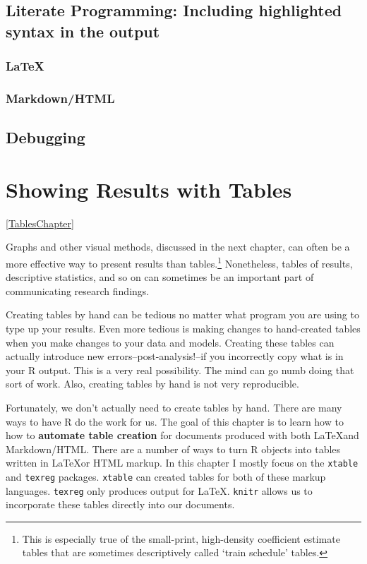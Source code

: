 \documentclass[ChapterTOCs,krantz1]{krantz}\usepackage{graphicx, color}
\begin{document}
{{\section{Literate Programming: Including highlighted syntax in the output}

\subsection{\LaTeX}

\subsection{Markdown/HTML}

\section{Debugging}





\chapter{Showing Results with Tables}\ref{TablesChapter}

Graphs and other visual methods, discussed in the next chapter, can
often be a more effective way to present results than tables.\footnote{This
  is especially true of the small-print, high-density coefficient
  estimate tables that are sometimes descriptively called `train
  schedule' tables.} Nonetheless, tables of results, descriptive statistics,
and so on can sometimes be an important part of communicating
research findings.

Creating tables by hand can be tedious no matter what program you are
using to type up your results. Even more tedious is making changes to
hand-created tables when you make changes to your data and models.
Creating these tables can actually introduce new
errors--post-analysis!--if you incorrectly copy what is in your
R output. This is a very real possibility. The mind can go numb
doing that sort of work. Also, creating tables by hand is not very
reproducible.

Fortunately, we don't actually need to create tables by hand. There are
many ways to have R do the work for us. The goal of this
chapter is to learn how to how to \textbf{automate table creation} for
documents produced with both \LaTeX and Markdown/HTML. There are a
number of ways to turn R objects into tables written in
\LaTeX or HTML markup. In this chapter I mostly focus on the
\texttt{xtable} and \texttt{texreg} packages. \texttt{xtable} can
created tables for both of these markup languages. \texttt{texreg} only
produces output for \LaTeX. \texttt{knitr} allows us to incorporate
these tables directly into our documents.

}}
\end{document}
